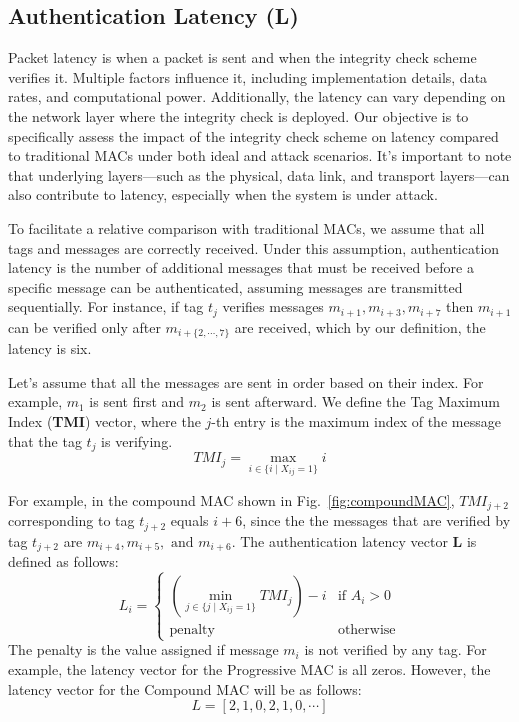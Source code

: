 \subsection{Authentication Latency (L)}
Packet latency is when a packet is sent and when the integrity check scheme verifies it. Multiple factors influence it, including implementation details, data rates, and computational power. Additionally, the latency can vary depending on the network layer where the integrity check is deployed. Our objective is to specifically assess the impact of the integrity check scheme on latency compared to traditional MACs under both ideal and attack scenarios. It's important to note that underlying layers—such as the physical, data link, and transport layers—can also contribute to latency, especially when the system is under attack.

To facilitate a relative comparison with traditional MACs, we assume that all tags and messages are correctly received. Under this assumption, authentication latency is the number of additional messages that must be received before a specific message can be authenticated, assuming messages are transmitted sequentially. For instance, if tag $t_j$ verifies messages \( m_{i+1}, m_{i+3}, m_{i+7} \) then \( m_{i+1}\) can be verified only after \( m_{i+\{2,\cdots,7\}} \) are received, which by our definition, the latency is six.

Let's assume that all the messages are sent in order based on their index. For example, \( m_1 \) is sent first and \( m_2 \) is sent afterward. We define the Tag Maximum Index (\textbf{TMI}) vector, where the \( j \)-th entry is the maximum index of the message that the tag \( t_j \) is verifying.
\begin{equation}
TMI_j= \max_{i \in \{i \mid X_{ij} = 1\}} i 
\end{equation}

For example, in the compound MAC shown in Fig.~\ref{fig:compoundMAC}, \( TMI_{j+2} \) corresponding to tag \( t_{j+2} \) equals \( i+6 \), since the the messages that are verified by tag \( t_{j+2} \) are \( m_{i+4}, m_{i+5}, \text{ and } m_{i+6}\).
The authentication latency vector \( \textbf{L} \) is defined as follows:
\begin{equation}
L_i = 
\begin{cases} 
\left(\min_{j \in \{j \mid X_{ij}=1 \}} TMI_j \right)-i & \text{if } A_i > 0 \\
\text{penalty} & \text{otherwise}
\end{cases}
\end{equation}
The penalty is the value assigned if message \( m_i \) is not verified by any tag. For example, the latency vector for the Progressive MAC is all zeros. However, the latency vector for the Compound MAC will be as follows:
$$L = [2, 1, 0, 2, 1, 0, \cdots]$$

